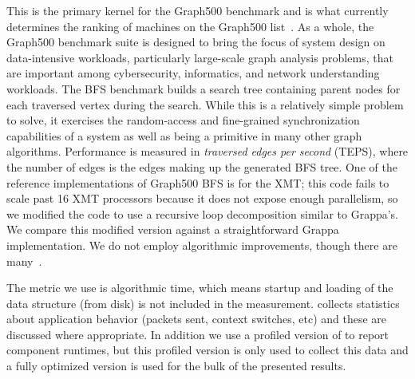 \vspace{0.5ex}
 This is the primary kernel for the
Graph500 benchmark and is what currently determines the ranking of machines on
the Graph500 list~\cite{graph500list}. As a whole, the Graph500 benchmark
suite is designed to bring the focus of system design on data-intensive
workloads, particularly large-scale graph analysis problems, that are
important among cybersecurity, informatics, and network understanding
workloads. The BFS benchmark builds a search tree containing parent nodes for
each traversed vertex during the search. While this is a relatively simple
problem to solve, it exercises the random-access and fine-grained
synchronization capabilities of a system as well as being a primitive in many
other graph algorithms. Performance is measured in \emph{traversed edges per
second\/} (TEPS), where the number of edges is the edges making up the
generated BFS tree. One of the reference implementations of Graph500 BFS is
for the XMT; this code fails to scale past 16 XMT processors because it does
not expose enough parallelism, so we modified the code to use a recursive loop
decomposition similar to Grappa's. We compare this modified version against a
straightforward Grappa implementation. We do not employ algorithmic
improvements, though there are
many~\cite{Beamer:Graph500,Yoo:FixedPointGraph500}.

\vspace{0.5ex}
 

\vspace{0.5ex}
 


The metric we use is algorithmic time, which means startup and loading of the
data structure (from disk) is not included in the measurement. \Grappa
collects statistics about application behavior (packets sent, context
switches, etc) and these are discussed where appropriate. In addition we use a
profiled version of \Grappa to report component runtimes, but this profiled
version is only used to collect this data and a fully optimized version is
used for the bulk of the presented results.


